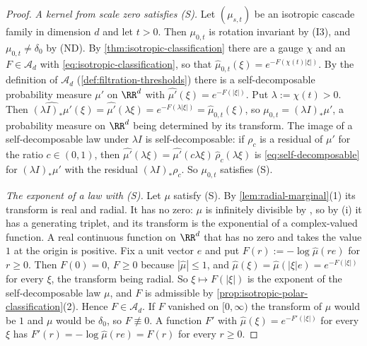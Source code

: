 \begin{proof}
\leanok
\emph{A kernel from scale zero satisfies (S).} Let $(\mu_{s,t})$ be an isotropic cascade family in
dimension $d$ and let $t > 0$. Then $\mu_{0,t}$ is rotation invariant by (I3), and
$\mu_{0,t} \ne \delta_0$ by (ND). By \ref{thm:isotropic-classification} there are a gauge $\chi$
and an $F \in \mathcal{A}_d$ with \ref{eq:isotropic-classification}, so that
$\widehat\mu_{0,t}(\xi) = e^{-F(\chi(t)|\xi|)}$. By the definition of $\mathcal{A}_d$
(\ref{def:filtration-thresholds}) there is a self-decomposable probability measure $\mu'$ on
$\RR^d$ with $\widehat{\mu'}(\xi) = e^{-F(|\xi|)}$. Put $\lambda := \chi(t) > 0$. Then
$\widehat{(\lambda I)_*\mu'}(\xi) = \widehat{\mu'}(\lambda\xi) = e^{-F(\lambda|\xi|)}
= \widehat\mu_{0,t}(\xi)$, so $\mu_{0,t} = (\lambda I)_*\mu'$, a probability measure on $\RR^d$
being determined by its transform. The image of a self-decomposable law under $\lambda I$ is
self-decomposable: if $\rho_c$ is a residual of $\mu'$ for the ratio $c \in (0,1)$, then
$\widehat{\mu'}(\lambda\xi) = \widehat{\mu'}(c\lambda\xi)\,\widehat\rho_c(\lambda\xi)$ is
\ref{eq:self-decomposable} for $(\lambda I)_*\mu'$ with the residual $(\lambda I)_*\rho_c$. So
$\mu_{0,t}$ satisfies (S).

\emph{The exponent of a law with (S).} Let $\mu$ satisfy (S). By \ref{lem:radial-marginal}(1)
its transform is real and radial. It has no zero: $\mu$ is infinitely divisible by ,
so by (i) it has a generating triplet, and its transform is the exponential of a
complex-valued function. A real continuous function on $\RR^d$ that has no zero and takes the
value $1$ at the origin is positive. Fix a unit vector $e$ and put
$F(r) := -\log\widehat\mu(re)$ for $r \ge 0$. Then $F(0) = 0$, $F \ge 0$ because
$|\widehat\mu| \le 1$, and $\widehat\mu(\xi) = \widehat\mu(|\xi|e) = e^{-F(|\xi|)}$ for every
$\xi$, the transform being radial. So $\xi \mapsto F(|\xi|)$ is the exponent of the
self-decomposable law $\mu$, and $F$ is admissible by
\ref{prop:isotropic-polar-classification}(2). Hence $F \in \mathcal{A}_d$. If $F$ vanished on
$[0,\infty)$ the transform of $\mu$ would be $1$ and $\mu$ would be $\delta_0$, so
$F \not\equiv 0$. A function $F'$ with $\widehat\mu(\xi) = e^{-F'(|\xi|)}$ for every $\xi$ has
$F'(r) = -\log\widehat\mu(re) = F(r)$ for every $r \ge 0$.


\end{proof}
